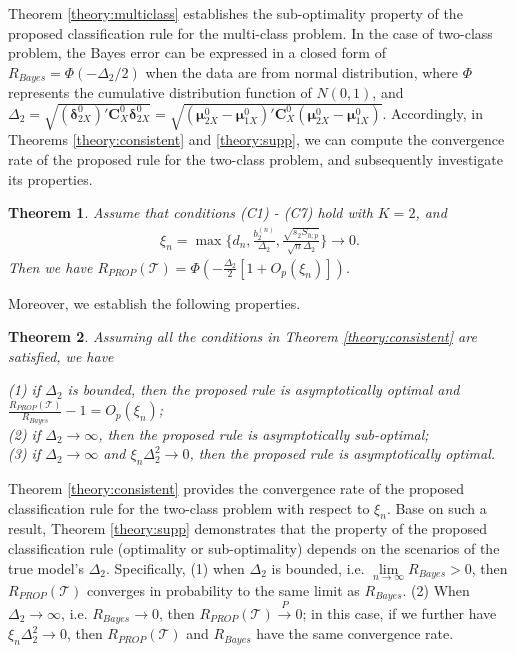 \documentclass[12pt]{article}
\newtheorem{theorem}{Theorem}%
\begin{document}
Theorem \ref{theory:multiclass} establishes the sub-optimality property of the proposed classification rule for the multi-class problem.
In the case of two-class problem, the Bayes error can be expressed in a closed form of $R_{Bayes} = \Phi( - \Delta_2 / 2)$
when the data are from normal distribution, where $\Phi$ represents the cumulative distribution function of $N(0, 1)$,
and $\Delta_2 = \sqrt{(\bm \delta_{2X}^0)' \bm C_X^0 \bm \delta_{2X}^0} = \sqrt{(\bm \mu_{2X}^0 - \bm \mu_{1X}^0)' \bm C_X^0 (\bm \mu_{2X}^0 - \bm \mu_{1X}^0)}$.
Accordingly, in Theorems \ref{theory:consistent} and \ref{theory:supp}, we can compute the convergence rate of the proposed rule for the two-class problem, and subsequently investigate its properties.

\begin{theorem}{}{\label{theory:consistent}}
Assume that conditions (C1) - (C7) hold with $K = 2$, and
\begin{align*}
\xi_n = \max \{ d_n, \frac{b_2^{(n)}}{\Delta_2}, \frac{\sqrt{s_2 S_{h;p}}}{\sqrt{n} \Delta_2} \} \rightarrow 0.
\end{align*}
Then we have $R_{PROP}(\mathcal{T}) = \Phi(-\frac{\Delta_2}{2} [1 + O_p(\xi_n)])$.
\end{theorem}
Moreover, we establish the following properties.
\begin{theorem}{}{\label{theory:supp}}
Assuming all the conditions in Theorem \ref{theory:consistent} are satisfied, we have

\noindent (1) if $\Delta_2$ is bounded, then the proposed rule is asymptotically optimal and
$\frac{R_{PROP}(\mathcal{T})}{R_{Bayes}} - 1 = O_p(\xi_n)$; \\
(2) if $\Delta_2 \rightarrow \infty$, then the proposed rule is asymptotically sub-optimal;  \\
(3) if $\Delta_2 \rightarrow \infty$ and $\xi_n \Delta_2^2 \rightarrow 0$,
then the proposed rule is asymptotically optimal.
\end{theorem}

Theorem \ref{theory:consistent} provides the convergence rate of the proposed classification rule for the two-class problem with respect to $\xi_n$.
Base on such a result, Theorem \ref{theory:supp} demonstrates that the property of the proposed classification rule (optimality or sub-optimality) depends on the scenarios of the true model's $\Delta_2$.
Specifically, (1) when $\Delta_2$ is bounded, i.e. $\lim\limits_{n \rightarrow \infty} R_{Bayes} > 0$, then $R_{PROP}(\mathcal{T})$ converges in probability to the same limit as $R_{Bayes}$.
(2) When $\Delta_2 \rightarrow \infty$, i.e. $R_{Bayes} \rightarrow 0$, then   $R_{PROP}(\mathcal{T}) \stackrel{P}{\rightarrow} 0$;
in this case, if we further have $\xi_n \Delta_2^2 \rightarrow 0$, then $R_{PROP}(\mathcal{T})$ and $R_{Bayes}$ have the same convergence rate.
\end{document}

